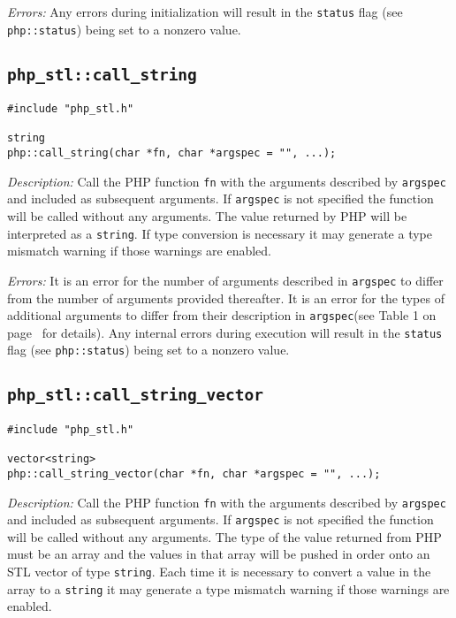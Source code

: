 \documentclass[11pt,titlepage]{article}
\begin{document}
\emph{Errors:} Any errors during initialization will result in the \verb|status| flag (see \verb|php::status|) being set to a nonzero value.


\subsection{\texttt{php\_stl::call\_string}}

\begin{verbatim}
#include "php_stl.h"

string 
php::call_string(char *fn, char *argspec = "", ...);
\end{verbatim}

\emph{Description:} Call the PHP function \verb|fn| with the arguments described by \verb|argspec| and included as subsequent arguments. If \verb|argspec| is not specified the function will be called without any arguments. The value returned by PHP will be interpreted as a \verb|string|. If type conversion is necessary it may generate a type mismatch warning if those warnings are enabled.

\emph{Errors:} It is an error for the number of arguments described in \verb|argspec| to differ from the number of arguments provided thereafter. It is an error for the types of additional arguments to differ from their description in \verb|argspec|(see Table 1 on page~\pageref{Table1} for details). Any internal errors during execution will result in the \verb|status| flag (see \verb|php::status|) being set to a nonzero value.


\subsection{\texttt{php\_stl::call\_string\_vector}}

\begin{verbatim}
#include "php_stl.h"

vector<string> 
php::call_string_vector(char *fn, char *argspec = "", ...);
\end{verbatim}

\emph{Description:} Call the PHP function \verb|fn| with the arguments described by \verb|argspec| and included as subsequent arguments. If \verb|argspec| is not specified the function will be called without any arguments. The type of the value returned from PHP must be an array and the values in that array will be pushed in order onto an STL vector of type \verb|string|. Each time it is necessary to convert a value in the array to a \verb|string| it may generate a type mismatch warning if those warnings are enabled.
\end{document}
